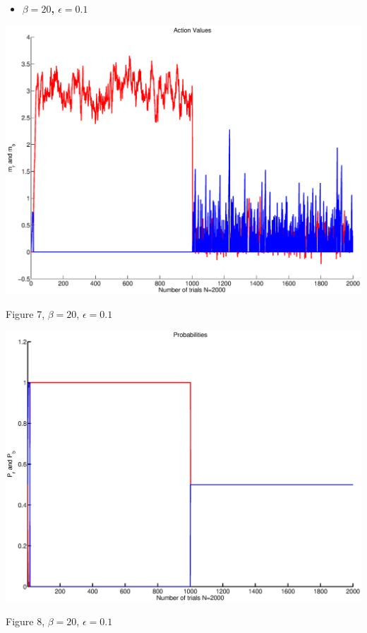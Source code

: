 \documentclass{article}
\begin{document}
\begin{itemize}
 \item \textbf{ $\beta=20$, $\epsilon=0.1$}
\end{itemize}

\begin{center}
\includegraphics[width=\textwidth]{action3.eps}
\begin{footnotesize}
 Figure 7, $\beta=20$, $\epsilon=0.1$
\end{footnotesize}
\end{center}

\begin{center}
\includegraphics[width=\textwidth]{prob3.eps}
\begin{footnotesize}
 Figure 8, $\beta=20$, $\epsilon=0.1$
\end{footnotesize}
\end{center}
\end{document}
